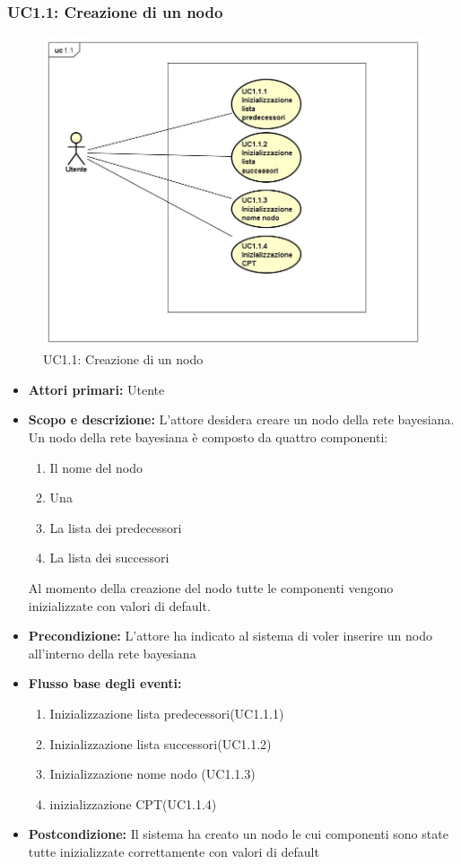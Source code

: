 \subsubsection{UC1.1: Creazione di un nodo} 
\begin{figure} [H]
	\centering
	\includegraphics[scale=0.45]{Img/UC1-1} 
	\caption{UC1.1: Creazione di un nodo} \label{} 
\end{figure} 
\begin{itemize} 
	\item{\textbf{Attori primari:} Utente} 
	\item{\textbf{Scopo e descrizione:} L'attore desidera creare un nodo della rete bayesiana. Un nodo della rete bayesiana è composto da quattro componenti: 
	\begin{enumerate} 
		\item{Il nome del nodo} 
		\item{Una  } 
		\item{La lista dei predecessori} 
		\item{La lista dei successori} 
	\end{enumerate} 
Al momento della creazione del nodo tutte le componenti vengono inizializzate con valori di default.} 
	\item{\textbf{Precondizione:} L'attore ha indicato al sistema di voler inserire un nodo all'interno della rete bayesiana} 
	\item{\textbf{Flusso base degli eventi:} } 
		\begin{enumerate} 
			\item{Inizializzazione lista predecessori(UC1.1.1)} 
			\item{Inizializzazione lista successori(UC1.1.2)} 
			\item{Inizializzazione nome nodo (UC1.1.3)} 
			\item{inizializzazione CPT(UC1.1.4)} 
		\end{enumerate} 
	\item{\textbf{Postcondizione:} Il sistema ha creato un nodo le cui componenti sono state tutte inizializzate correttamente con valori di default} 
\end{itemize} 
